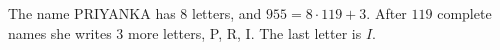 The name PRIYANKA has $8$ letters, and $955=8\cdot119+3$. After $119$ complete names she writes $3$ more letters, P, R, I. The last letter is $\boxed{I}$.
